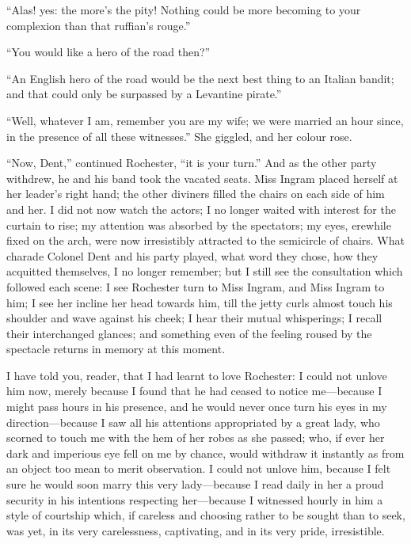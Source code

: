 \enquote{Alas! yes: the more's the pity! Nothing could be more becoming
	to your complexion than that ruffian's rouge.}

\enquote{You would like a hero of the road then?}

\enquote{An English hero of the road would be the next best thing to an
	Italian bandit; and that could only be surpassed by a Levantine pirate.}

\enquote{Well, whatever I am, remember you are my wife; we were married
	an hour since, in the presence of all these witnesses.} She giggled,
and her colour rose.

\enquote{Now, Dent,} continued \Mr{} Rochester, \enquote{it is your
	turn.} And as the other party withdrew, he and his band took the
vacated seats. Miss Ingram placed herself at her leader's right hand;
the other diviners filled the chairs on each side of him and her. I did
not now watch the actors; I no longer waited with interest for the
curtain to rise; my attention was absorbed by the spectators; my eyes,
erewhile fixed on the arch, were now irresistibly attracted to the
semicircle of chairs. What charade Colonel Dent and his party played,
what word they chose, how they acquitted themselves, I no longer
remember; but I still see the consultation which followed each scene: I
see \Mr{} Rochester turn to Miss Ingram, and Miss Ingram to him; I see her
incline her head towards him, till the jetty curls almost touch his
shoulder and wave against his cheek; I hear their mutual whisperings; I
recall their interchanged glances; and something even of the feeling
roused by the spectacle returns in memory at this moment.

I have told you, reader, that I had learnt to love \Mr{} Rochester: I
could not unlove him now, merely because I found that he had ceased to
notice me---because I might pass hours in his presence, and he would
never once turn his eyes in my direction---because I saw all his
attentions appropriated by a great lady, who scorned to touch me with
the hem of her robes as she passed; who, if ever her dark and imperious
eye fell on me by chance, would withdraw it instantly as from an object
too mean to merit observation. I could not unlove him, because I felt
sure he would soon marry this very lady---because I read daily in her a
proud security in his intentions respecting her---because I witnessed
hourly in him a style of courtship which, if careless and choosing
rather to be sought than to seek, was yet, in its very carelessness,
captivating, and in its very pride, irresistible.

